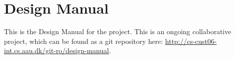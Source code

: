 
\chapter{Design Manual}
\label{app:design_manual}

This is the Design Manual for the \giraf project. This is an ongoing collaborative project, which can be found as a git repository here: \url{http://cs-cust06-int.cs.aau.dk/git-ro/design-manual}.

